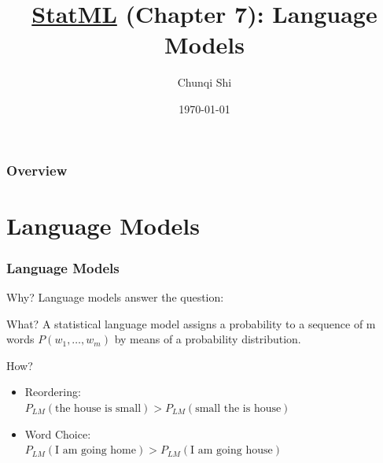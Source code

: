 \documentclass{beamer}
\title[Language Model]{\href{http://www.statmt.org/book/}{StatML} (Chapter 7): Language Models} %
\author{Chunqi Shi} %
\institute[Brandeis Univ.] %
{
Brandeis University \\ %
\medskip
\textit{shicq@brandeis.edu} %
}
\date{\today} %
\begin{document}
\begin{frame}
\titlepage %
\end{frame}

\begin{frame}
\frametitle{Overview} %
\tableofcontents %
\end{frame}


\section{Language Models}



\begin{frame}\frametitle{Language Models}


\begin{block}{Why?}
Language models answer the question: \\
\end{block}

\begin{block}{What?}
A statistical language model assigns a \alert{probability} to a sequence of m
words $P(w_1,\ldots,w_m)$ by means of a probability distribution.
\end{block}

\begin{block}{How?}

\begin{itemize}
\item Reordering: \\ \quad  $P_{LM}(\text{the house is small}) > P_{LM}(\text{small the is house})$
\item Word Choice: \\ \quad $P_{LM}(\text{I am going home}) > P_{LM}(\text{I am going house})$
\end{itemize}

\end{block}

\end{frame}
\end{document}
